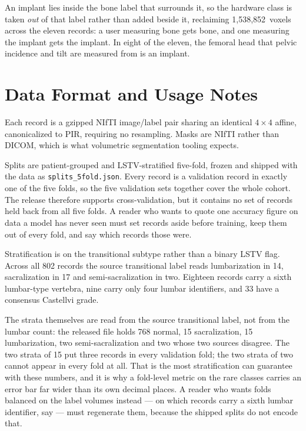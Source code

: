 \documentclass[aapm,mph,amsmath,amssymb,preprint,linenumbers]{revtex4-2}
\begin{document}
An implant lies inside the bone label that surrounds it, so the hardware class is taken
\emph{out} of that label rather than added beside it, reclaiming 1,538,852\ voxels across
the eleven records: a user measuring bone gets bone, and one measuring the implant gets the
implant. In eight of the eleven, the femoral head that pelvic incidence and tilt are measured
from is an implant.

\section{Data Format and Usage Notes}\label{sec:format}

Each record is a gzipped NIfTI image/label pair sharing an identical $4\times4$ affine,
canonicalized to PIR, requiring no resampling. Masks are NIfTI rather than DICOM, which is what
volumetric segmentation tooling expects.

Splits are patient-grouped and LSTV-stratified five-fold, frozen and shipped with the data
as \texttt{splits\_5fold.json}. Every record is a validation record in exactly one of the
five folds, so the five validation sets together cover the whole cohort. The release
therefore supports cross-validation, but it contains no set of records held back from all
five folds. A reader who wants to quote one accuracy figure on data a model has never seen
must set records aside before training, keep them out of every fold, and say which records
those were.

Stratification is on the transitional subtype rather than a binary LSTV flag. Across all
802 records the source transitional label reads lumbarization in 14, sacralization in 17
and semi-sacralization in two. Eighteen records carry a sixth lumbar-type vertebra, nine
carry only four lumbar identifiers, and 33 have a consensus Castellvi grade.

The strata themselves are read from the source transitional label, not from the lumbar
count: the released file holds 768 normal, 15 sacralization, 15 lumbarization, two
semi-sacralization and two whose two sources disagree. The two strata of 15 put three
records in every validation fold; the two strata of two cannot appear in every fold at all.
That is the most stratification can guarantee with these numbers, and it is why a
fold-level metric on the rare classes carries an error bar far wider than its own decimal
places. A reader who wants folds balanced on the label volumes instead --- on which records
carry a sixth lumbar identifier, say --- must regenerate them, because the shipped splits do
not encode that.
\end{document}
